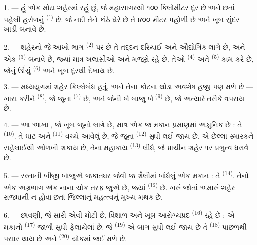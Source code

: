 \VUsaut{2.0mm}
\VUsaut{3.0mm}
\VUfilet{16mm}
\VUsaut{5.6mm}
\VUsaut{1.4mm}
\VUsaut{2.2mm}

\VUsaut{3.0mm}

1. --- હું એક મોટા શહેરમાં રહું છું, જે મહાસાગરથી ૧૦૦ કિલોમીટર દૂર છે
અને છતાં પહેલી હરોળનું  \textsuperscript{(1)} છે. જે નદી
તેને કાંઠે ઘેરે છે તે ૪૦૦ મીટર પહોળી છે અને ખૂબ સુંદર ખાડી બનાવે છે.

2. --- શહેરનો જે આખો ભાગ  \textsuperscript{(2)} પર છે તે
તદ્દન દરિયાઈ અને ઔદ્યોગિક લાગે છે, અને એક 
\textsuperscript{(3)} બનાવે છે, જ્યાં માત્ર ખલાસીઓ અને મજૂરો રહે છે.
તેઓ  \textsuperscript{(4)} અને  \textsuperscript{(5)} કામ કરે છે, જેનું ઊંચું
 \textsuperscript{(6)} અને  ખૂબ
દૂરથી દેખાય છે.

3. --- મધ્યયુગમાં શહેર કિલ્લેબંધ હતું, અને તેના કોટના થોડા અવશેષ હજી
પણ મળે છે — ખાસ કરીને  \textsuperscript{(8)}, જે જૂના
 \textsuperscript{(7)} છે, અને જેની બે બાજુ બે
 \textsuperscript{(9)} છે, જે અત્યારે 
તરીકે વપરાય છે.

4. --- આ આખા , જે ખૂબ જૂનો લાગે છે, માત્ર એક જ મકાન
પ્રમાણમાં આધુનિક છે : તે  \textsuperscript{(10)}. તે
ઘાટ અને  \textsuperscript{(11)} વચ્ચે આવેલું છે, જે જૂના
 \textsuperscript{(12)} સુધી લઈ જાય છે. એ છેલ્લા
સ્મારકને સહેલાઈથી ઓળખી શકાય છે, તેના મહાકાય 
\textsuperscript{(13)} લીધે, જે પ્રાચીન શહેર પર પ્રભુત્વ ધરાવે છે.

5. --- રસ્તાની બીજી બાજુએ જકાતઘર જેવી જ શૈલીમાં બાંધેલું એક મકાન
 : તે  \textsuperscript{(14)}. તેનો એક
અગ્રભાગ એક નાના ચોક તરફ જુએ છે, જ્યાં 
\textsuperscript{(15)} છે. ખરું જોતાં અમારું શહેર રાજધાની ન હોવા છતાં
જિલ્લાનું મહત્ત્વનું મુખ્ય મથક છે.

\VUsaut{5.0mm}
\VUsaut{3.4mm}

6. --- છાવણી, જે સારી એવી મોટી છે, વિશાળ અને ખૂબ આરોગ્યપ્રદ
 \textsuperscript{(16)} રહે છે ; એ મકાનો
 \textsuperscript{(17)} જાળી સુધી ફેલાયેલાં છે. જે
 \textsuperscript{(19)} એ બાગ સુધી લઈ જાય છે તે
 \textsuperscript{(18)} પાછળથી પસાર થાય છે અને
 \textsuperscript{(20)} ચોકમાં જઈ મળે છે.

